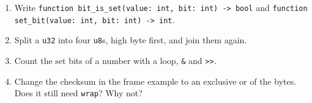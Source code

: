 \begin{tryit}
\begin{enumerate}
\item Write \verb|function bit_is_set(value: int, bit: int) -> bool|
  and \verb|function set_bit(value: int, bit: int) -> int|.
\item Split a \verb|u32| into four \verb|u8|s, high byte first, and
  join them again.
\item Count the set bits of a number with a loop, \verb|&| and
  \verb|>>|.
\item Change the checksum in the frame example to an exclusive or of
  the bytes. Does it still need \verb|wrap|? Why not?
\end{enumerate}
\end{tryit}
